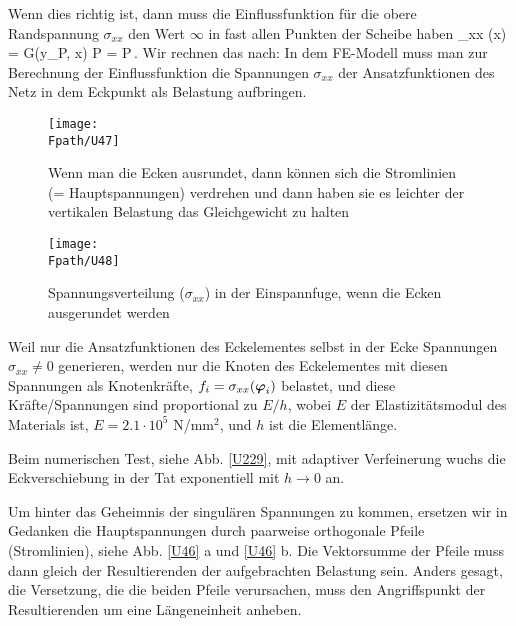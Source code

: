 Wenn dies richtig ist, dann muss die Einflussfunktion f\"{u}r die obere Randspannung $\sigma_{xx}$ den Wert $\infty $ in fast allen Punkten der Scheibe haben
\beq
\sigma_{xx} (\vek x) = \textcolor{chapterTitleBlue}{\vek G(\vek y_P, \vek x) }\dotprod  \vek P = \textcolor{chapterTitleBlue}{\vek \infty} \dotprod  \vek P\,.
\eeq
Wir rechnen das nach: In dem FE-Modell muss man zur Berechnung der Einflussfunktion die Spannungen $\sigma_{xx}$ der Ansatzfunktionen des Netz in dem Eckpunkt als Belastung aufbringen.
\begin{figure}
\centering
{\texttt{[image: \\Fpath/U47]}}
\caption{Wenn man die Ecken ausrundet, dann k\"{o}nnen sich die \glq Stromlinien\grq{} (= Hauptspannungen) verdrehen und dann haben sie es leichter der vertikalen Belastung das Gleichgewicht zu halten}
\label{U47}%
\end{figure}%
\begin{figure}
\centering
\texttt{[image: \\Fpath/U48]}
\caption{Spannungsverteilung ($\sigma_{xx}$) in der Einspannfuge, wenn die Ecken ausgerundet werden}
\label{U48}%
\end{figure}%

Weil nur die Ansatzfunktionen des Eckelementes selbst in der Ecke Spannungen $\sigma_{xx}\neq 0$ generieren, werden nur die Knoten des Eckelementes mit diesen Spannungen als Knotenkr\"{a}fte, $f_i = \sigma_{xx}(\mbox{\boldmath $\varphi$}_i)$ belastet, und diese Kr\"{a}fte/Spannungen sind proportional zu $E/h$, wobei $E$ der Elastizit\"{a}tsmodul des Materials ist, $E = 2.1 \cdot 10^5$ N/mm$^2$, und $h$ ist die Elementl\"{a}nge.

Beim numerischen Test, siehe Abb. \ref{U229}, mit adaptiver Verfeinerung wuchs die Eckverschiebung in der Tat exponentiell mit $h \to 0$ an.

Um hinter das Geheimnis der singul\"{a}ren Spannungen zu kommen, ersetzen wir in Gedanken die Hauptspannungen durch paarweise orthogonale Pfeile (\glq Stromlinien\grq{}), siehe Abb. \ref{U46} a und  \ref{U46} b. Die Vektorsumme der Pfeile muss dann gleich der Resultierenden der aufgebrachten Belastung sein. Anders gesagt, die Versetzung, die die beiden Pfeile verursachen, muss den Angriffspunkt der Resultierenden um eine L\"{a}ngeneinheit anheben.

